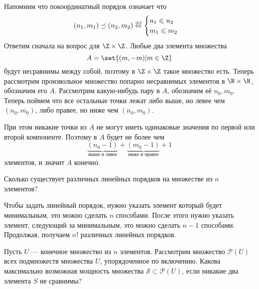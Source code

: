 \documentclass[a4paper,12pt,twoside]{article}
\begin{document}
\begin{solution}{}
    Напомним что покоординатный порядок означает что 
    \[
        (n_1, m_1) \preceq (n_2, m_2) \overset{\text{\tiny def}}{\Leftrightarrow} \begin{cases}
            n_1 \leq n_2 \\
            m_1 \leq m_2
        \end{cases}
    \]
    Ответим сначала на вопрос для \(\Z \times \Z\). Любые два элемента множества  
    \[
        A = \set{(m, -m) | m \in \Z}
    \]
    будут несравнимы между собой, поэтому в \(\Z \times \Z\) такое множество есть. Теперь рассмотрим произвольное множество попарно несравнимых элементов в \(\N \times \N\), обозначим его \(A\). Рассмотрим какую-нибудь пару в \(A\), обозначим её \(n_0, m_0\). Теперь поймем что все остальные точки лежат либо выше, но левее чем \((n_0, m_0)\), либо правее, но ниже чем \((n_0, m_0)\).
    \begin{center}
    \end{center}
    При этом никакие точки из \(A\) не могут иметь одинаковые значения по первой или второй компоненте. Поэтому в \(A\) будет не более чем 
    \[
        \underbrace{(n_0 - 1)}_{\text{выше и левее}} + \underbrace{(m_0 - 1)}_{\text{ниже и правее}} + 1 
    \]
    элементов, и значит \(A\) конечно.
\end{solution}
\begin{?}
    Сколько существует различных линейных порядков на множестве из \(n\) элементов?
\end{?}
\begin{solution}{}
    Чтобы задать линейный порядок, нужно указать элемент который будет минимальным, это можно сделать \(n\) способами. После этого нужно указать элемент, следующий за минимальным, это можно сделать \(n - 1\) способами. Продолжая, получаем \(n!\) различных линейных порядков. 
\end{solution}
\begin{?}
    Пусть \(U\) --- конечное множество из \(n\) элементов. Рассмотрим множество \(\mathcal{P}(U)\) всех подмножеств множества \(U\), упорядоченное по включению. Какова максимально возможная мощность множества \(\mathcal{S} \subset \mathcal{P}(U)\), если никакие два элемента \(S\) не сравнимы?
\end{?}
\end{document}
